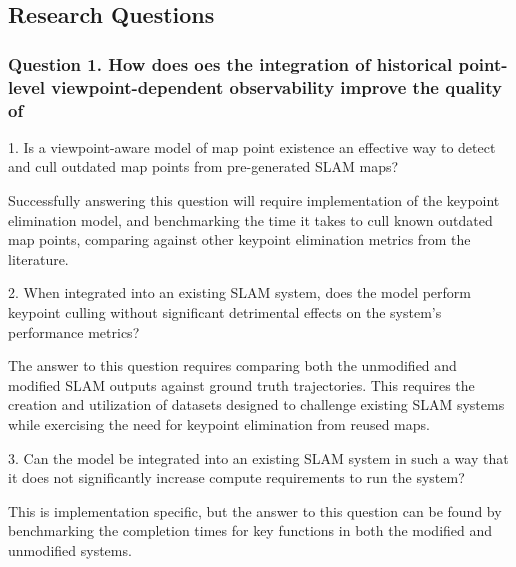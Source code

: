 \subsection{Research Questions}

\subsubsection*{Question 1. How does oes the integration of historical point-level viewpoint-dependent observability improve the quality of }


1. Is a viewpoint-aware model of map point existence an effective way to detect and cull outdated map points from pre-generated SLAM maps?

Successfully answering this question will require implementation of the keypoint elimination model, and benchmarking the time it takes to cull known outdated map points, comparing against other keypoint elimination metrics from the literature.


2. When integrated into an existing SLAM system, does the model perform keypoint culling without significant detrimental effects on the system's performance metrics?

The answer to this question requires comparing both the unmodified and modified SLAM outputs against ground truth trajectories. This requires the creation and utilization of datasets designed to challenge existing SLAM systems while exercising the need for keypoint elimination from reused maps.


3. Can the model be integrated into an existing SLAM system in such a way that it does not significantly increase compute requirements to run the system?

This is implementation specific, but the answer to this question can be found by benchmarking the completion times for key functions in both the modified and unmodified systems.